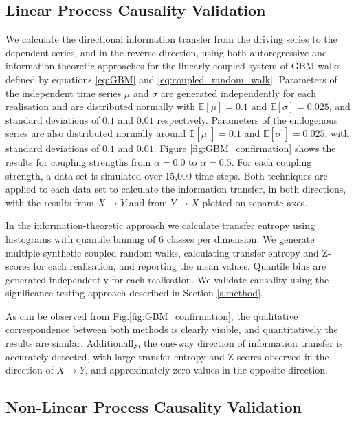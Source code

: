 \documentclass[]{rsos}%
\begin{document}
  \subsection{Linear Process Causality Validation} 

  We calculate the directional information transfer from the driving series to the dependent series, and in the reverse direction, using both autoregressive and information-theoretic approaches for the linearly-coupled system of GBM walks defined by equations \ref{eq:GBM} and \ref{eq:coupled_random_walk}. Parameters of the independent time series $\mu$ and $\sigma $ are generated independently for each realisation and are distributed normally with $\mathbb{E} [\mu]=0.1$ and $\mathbb{E} [\sigma]=0.025$, and standard deviations of $0.1$ and $0.01$ respectively. Parameters of the endogenous series are also distributed normally around $\mathbb{E} [\mu^{\prime}]=0.1$ and $\mathbb{E} [\sigma^{\prime}]=0.025$, with standard deviations of $0.1$ and $0.01$. Figure \ref{fig:GBM_confirmation} shows the results for coupling strengths from $\alpha = 0.0$ to $\alpha = 0.5$. For each coupling strength, a data set is simulated over 15,000 time steps. Both techniques are applied to each data set to calculate the information transfer, in both directions, with the results from $X \rightarrow Y$ and from $Y \rightarrow X$ plotted on separate axes. 

  In the information-theoretic approach we calculate transfer entropy using histograms with quantile binning of 6 classes per dimension. We generate multiple synthetic coupled random walks, calculating transfer entropy and Z-scores for each realisation, and reporting the mean values. Quantile bins are generated independently for each realisation. We validate causality using the significance testing approach described in Section \ref{s.method}.

  As can be observed from Fig.\ref{fig:GBM_confirmation}, the qualitative correspondence between both methods is clearly visible, and quantitatively the results are similar. Additionally, the one-way direction of information transfer is accurately detected, with large transfer entropy and Z-scores observed in the direction of $X \rightarrow Y$, and approximately-zero values in the opposite direction.


    

 
  \subsection{Non-Linear Process Causality Validation}
\end{document}

